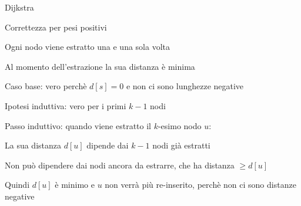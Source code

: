 \begin{frame}{Dijkstra}

\begin{block}{Correttezza per pesi positivi}
\BIL 
\item Ogni nodo viene estratto una e una sola volta
\item Al momento dell'estrazione la sua distanza è minima    
\EIL
\end{block}

\bigskip
{}

\BIL
\item Caso base: vero perchè $d[s]=0$ e non ci sono lunghezze negative
\item Ipotesi induttiva: vero per i primi $k-1$ nodi
\item Passo induttivo: quando viene estratto il $k$-esimo nodo $u$:
  \BI
  \item La sua distanza $d[u]$ dipende dai $k-1$ nodi già estratti
  \item Non può dipendere dai nodi ancora da estrarre, che ha distanza $\geq d[u]$
  \item Quindi $d[u]$ è minimo e $u$ non verrà più re-inserito, perchè non ci sono distanze negative
\EI
\EIL

\end{frame}

